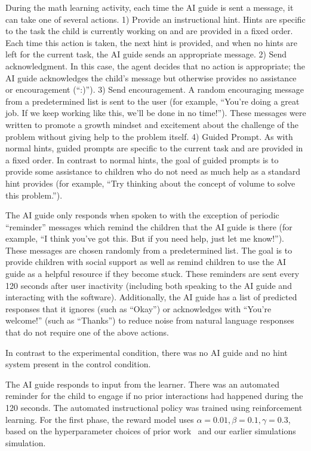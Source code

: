 \documentclass[sn-mathphys,Numbered]{sn-jnl}%
\theoremstyle{thmstyleone}%
\theoremstyle{thmstyletwo}%
\theoremstyle{thmstylethree}%
\begin{document}
\begin{appendices}
During the math learning activity, each time the AI guide is sent a message, it can take one of several actions. 1) Provide an instructional hint. Hints are specific to the task the child is currently working on and are provided in a fixed order. Each time this action is taken, the next hint is provided, and when no hints are left for the current task, the AI guide sends an appropriate message. 2) Send acknowledgment. In this case, the agent decides that no action is appropriate; the AI guide acknowledges the child’s message but otherwise provides no assistance or encouragement (“:)”). 3) Send encouragement. A random encouraging message from a predetermined list is sent to the user (for example, “You’re doing a great job. If we keep working like this, we’ll be done in no time!”). These messages were written to promote a growth mindset and excitement about the challenge of the problem without giving help to the problem itself. 4) Guided Prompt. As with normal hints, guided prompts are specific to the current task and are provided in a fixed order. In contrast to normal hints, the goal of guided prompts is to provide some assistance to children who do not need as much help as a standard hint provides (for example, “Try thinking about the concept of volume to solve this problem.”). 

The AI guide only responds when spoken to with the exception of periodic “reminder” messages which remind the children that the AI guide is there (for example, “I think you’ve got this. But if you need help, just let me know!”). These messages are chosen randomly from a predetermined list. The goal is to provide children with social support as well as remind children to use the AI guide as a helpful resource if they become stuck. These reminders are sent every 120 seconds after user inactivity (including both speaking to the AI guide and interacting with the software). Additionally, the AI guide has a list of predicted responses that it ignores (such as “Okay”) or acknowledges with “You’re welcome!” (such as “Thanks”) to reduce noise from natural language responses that do not require one of the above actions.

In contrast to the experimental condition, there was no AI guide and no hint system present in the control condition.

The AI guide responds to input from the learner. There was an automated reminder for the child to engage if no prior interactions had happened during the 120 seconds. The automated instructional policy was trained using reinforcement learning. For the first phase, the reward model uses $\alpha = 0.01, \beta = 0.1, \gamma = 0.3$, based on the hyperparameter choices of prior work~\cite{bassen2020reinforcement} and our earlier simulations simulation. 


\end{appendices}
\end{document}
